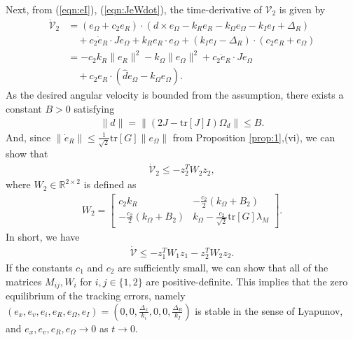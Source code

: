\documentclass[twocolumn,letterpaper]{IEEEAerospaceCLS}  %
\newcommand{\refeqn}[1]{(\ref{eqn:#1})}
\renewcommand{\Re}{\mathbb{R}}
\begin{document}
Next, from \refeqn{eI}, \refeqn{JeWdot}, the time-derivative of ${\mathcal{V}}_2$ is given by
\begin{align*}
\dot{\mathcal{V}}_2 & = (e_\Omega+c_2e_R)\cdot (d\times e_\Omega - k_R e_R -k_\Omega e_\Omega -k_I e_I +\Delta_R)\\
&\quad  + c_2\dot e_R \cdot Je_\Omega + k_Re_R\cdot e_\Omega +(k_Ie_I-\Delta_R)\cdot(c_2e_R+e_\Omega)\\
& = -c_2k_R \|e_R\|^2 -k_\Omega \|e_\Omega\|^2 +c_2\dot e_R\cdot Je_\Omega\\
&\quad + c_2 e_R\cdot (\hat d e_\Omega- k_\Omega e_\Omega).
\end{align*}
As the desired angular velocity is bounded from the assumption, there exists a constant $B>0$ satisfying
\begin{align*}
\|d\|=\|(2J-{\mathrm{tr}}[J]I)\Omega_d\| \leq  
B.
\end{align*}
And, since $\|\dot e_R\|\leq \frac{1}{\sqrt{2}}{\mathrm{tr}}[G]\|e_\Omega\|$ from Proposition \ref{prop:1},(vi), we can show that
\begin{align}
\dot{\mathcal{V}}_2 \leq -z_2^T W_2 z_2,\label{eqn:dotV2}
\end{align}
where $W_2\in{\Re}^{2\times 2}$ is defined as
\begin{align}
W_2 = \begin{bmatrix}
c_2 k_R & -\frac{c_2}{2}(k_\Omega+B_2)\\
-\frac{c_2}{2}(k_\Omega+B_2) & k_\Omega - \frac{c_2}{\sqrt{2}}{\mathrm{tr}}[G] \lambda_M
\end{bmatrix}.\label{eqn:W2}
\end{align}
In short, we have
\begin{align}
\dot{\mathcal{V}} \leq -z_1^T W_1 z_1-z_2^T W_2 z_2.
\end{align}
If the constants $c_1$ and $c_2$ are sufficiently small, we can show that all of the matrices $M_{ij},W_i$ for $i,j\in\{1,2\}$ are positive-definite. This implies that the zero equilibrium of the tracking errors, namely $(e_x,e_v,e_i,e_R,e_\Omega,e_I)=(0,0,\frac{\Delta_x}{k_i},0,0,\frac{\Delta_R}{k_I})$ is stable in the sense of Lyapunov, and $e_x,e_v,e_R,e_\Omega\rightarrow 0$ as $t\rightarrow 0$. 
\end{document}
